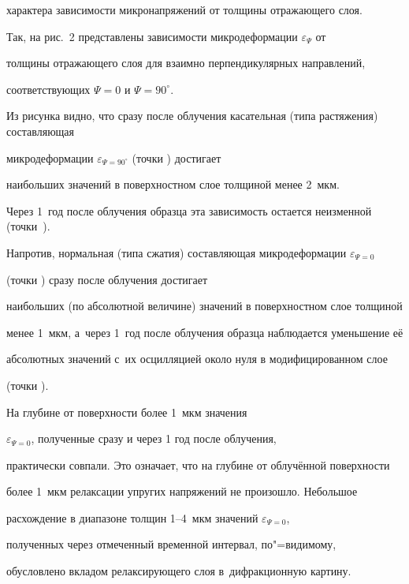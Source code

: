 характера зависимости микронапряжений от толщины отражающего слоя.

Так, на рис.~2 представлены зависимости микродеформации $\varepsilon _{\Psi }$ от

толщины отражающего слоя для взаимно перпендикулярных направлений,

соответствующих $\Psi =0$ и $\Psi =90^{\circ}$.

Из рисунка видно, что сразу после облучения касательная (типа растяжения) составляющая

микродеформации $\varepsilon _{\Psi =90^\circ}$ (точки \textbullet) достигает

наибольших значений в поверхностном слое толщиной менее 2~мкм.

Через 1~год после облучения образца эта зависимость остается неизменной (точки~\textopenbullet).

Напротив, нормальная (типа сжатия) составляющая микродеформации $\varepsilon_{\Psi =0}$

(точки ) сразу после облучения достигает

наибольших (по абсолютной величине) значений в поверхностном слое толщиной

менее 1~мкм, а~через 1~год после облучения образца наблюдается уменьшение её

абсолютных значений с~их осцилляцией около нуля в модифицированном слое

(точки ).

На глубине от поверхности более 1~мкм значения

$\varepsilon _{\Psi =0}$, полученные сразу и через 1 год после облучения,

практически совпали. Это означает, что на глубине от облучённой поверхности

более 1~мкм релаксации упругих напряжений не произошло. Небольшое

расхождение в диапазоне толщин 1--4~мкм значений $\varepsilon _{\Psi=0}$,

полученных через отмеченный временной интервал, по"=видимому,

обусловлено вкладом релаксирующего слоя в~дифракционную картину.





